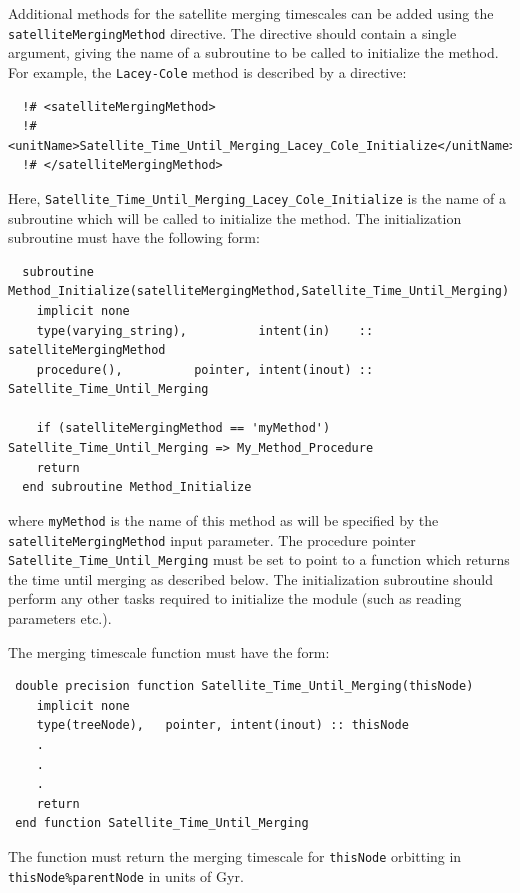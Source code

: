 Additional methods for the satellite merging timescales can be added using the {\tt satelliteMergingMethod} directive. The directive should contain a single argument, giving the name of a subroutine to be called to initialize the method. For example, the {\tt Lacey-Cole} method is described by a directive:
\begin{verbatim}
  !# <satelliteMergingMethod>
  !#  <unitName>Satellite_Time_Until_Merging_Lacey_Cole_Initialize</unitName>
  !# </satelliteMergingMethod>
\end{verbatim}
Here, {\tt Satellite\_Time\_Until\_Merging\_Lacey\_Cole\_Initialize} is the name of a subroutine which will be called to initialize the method. The initialization subroutine must have the following form:
\begin{verbatim}
  subroutine Method_Initialize(satelliteMergingMethod,Satellite_Time_Until_Merging)
    implicit none
    type(varying_string),          intent(in)    :: satelliteMergingMethod
    procedure(),          pointer, intent(inout) :: Satellite_Time_Until_Merging
    
    if (satelliteMergingMethod == 'myMethod') Satellite_Time_Until_Merging => My_Method_Procedure
    return
  end subroutine Method_Initialize
\end{verbatim}
where {\tt myMethod} is the name of this method as will be specified by the {\tt satelliteMergingMethod} input parameter. The procedure pointer {\tt Satellite\_Time\_Until\_Merging} must be set to point to a function which returns the time until merging as described below. The initialization subroutine should perform any other tasks required to initialize the module (such as reading parameters etc.).

The merging timescale function must have the form:
\begin{verbatim}
 double precision function Satellite_Time_Until_Merging(thisNode)
    implicit none
    type(treeNode),   pointer, intent(inout) :: thisNode
    .
    .
    .
    return
 end function Satellite_Time_Until_Merging
\end{verbatim}
The function must return the merging timescale for {\tt thisNode} orbitting in {\tt thisNode\%parentNode} in units of Gyr.

